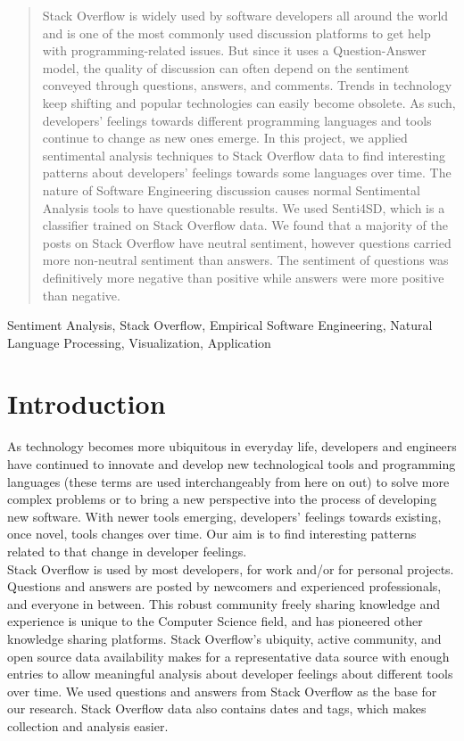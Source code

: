 \documentclass[conference]{IEEEtran}
\begin{document}
\begin{abstract}
Stack Overflow is widely used by software developers all around the world and is one of the most commonly used discussion platforms to get help with programming-related issues. But since it uses a Question-Answer model, the quality of discussion can often depend on the sentiment conveyed through questions, answers, and comments. Trends in technology keep shifting and popular technologies can easily become obsolete. As such, developers' feelings towards different programming languages and tools continue to change as new ones emerge. In this project, we applied sentimental analysis techniques to Stack Overflow data to find interesting patterns about developers' feelings towards some languages over time. The nature of Software Engineering discussion causes normal Sentimental Analysis tools to have questionable results. We used Senti4SD, which is a classifier trained on Stack Overflow data. We found that a majority of the posts on Stack Overflow have neutral sentiment, however questions carried more non-neutral sentiment than answers. The sentiment of questions was definitively more negative than positive while answers were more positive than negative.
\end{abstract}

\begin{IEEEkeywords}
Sentiment Analysis, Stack Overflow, Empirical Software Engineering, Natural Language Processing, Visualization, Application
\end{IEEEkeywords}

\section{Introduction}
As technology becomes more ubiquitous in everyday life, developers and engineers have continued to innovate and develop new technological tools and programming languages (these terms are used interchangeably from here on out) to solve more complex problems or to bring a new perspective into the process of developing new software. With newer tools emerging, developers' feelings towards existing, once novel, tools changes over time. Our aim is to find interesting patterns related to that change in developer feelings. \\

Stack Overflow is used by most developers, for work and/or for personal projects. Questions and answers are posted by newcomers and experienced professionals, and everyone in between. This robust community freely sharing knowledge and experience is unique to the Computer Science field, and has pioneered other knowledge sharing platforms. Stack Overflow's ubiquity, active community, and open source data availability makes for a representative data source with enough entries to allow meaningful analysis about developer feelings about different tools over time. We used questions and answers from Stack Overflow as the base for our research. Stack Overflow data also contains dates and tags, which makes collection and analysis easier.
\end{document}
